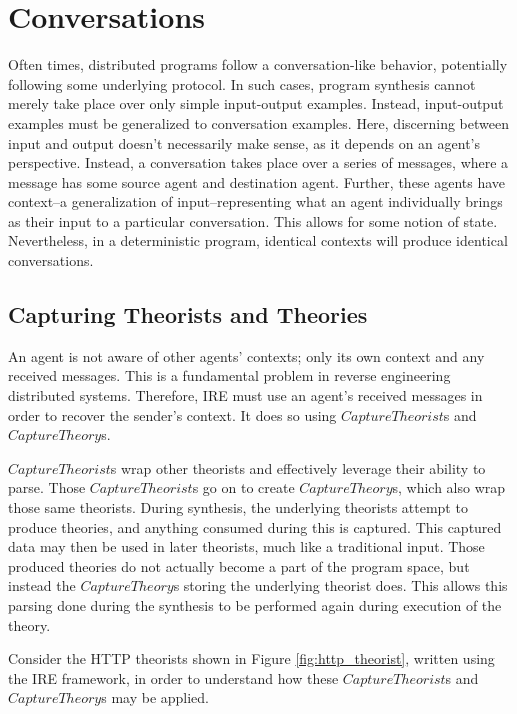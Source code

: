 \chapter{Conversations}

Often times, distributed programs follow a conversation-like behavior, potentially following some underlying protocol.
In such cases, program synthesis cannot merely take place over only simple input-output examples.
Instead, input-output examples must be generalized to conversation examples.
Here, discerning between input and output doesn't necessarily make sense, as it depends on an agent's perspective.
Instead, a conversation takes place over a series of messages, where a message has some source agent and destination agent.
Further, these agents have context--a generalization of input--representing what an agent individually brings as their input to a particular conversation.
This allows for some notion of state.
Nevertheless, in a deterministic program, identical contexts will produce identical conversations.


\section{Capturing Theorists and Theories}

An agent is not aware of other agents' contexts; only its own context and any received messages.
This is a fundamental problem in reverse engineering distributed systems.
Therefore, IRE must use an agent's received messages in order to recover the sender's context.
It does so using $CaptureTheorist$s and $CaptureTheory$s.

$CaptureTheorist$s wrap other theorists and effectively leverage their ability to parse.
Those $CaptureTheorist$s go on to create $CaptureTheory$s, which also wrap those same theorists.
During synthesis, the underlying theorists attempt to produce theories, and anything consumed during this is captured.
This captured data may then be used in later theorists, much like a traditional input.
Those produced theories do not actually become a part of the program space, but instead the $CaptureTheory$s storing the underlying theorist does.
This allows this parsing done during the synthesis to be performed again during execution of the theory.


Consider the HTTP theorists shown in Figure \ref{fig:http_theorist}, written using the IRE framework, in order to understand how these $CaptureTheorist$s and $CaptureTheory$s may be applied.

